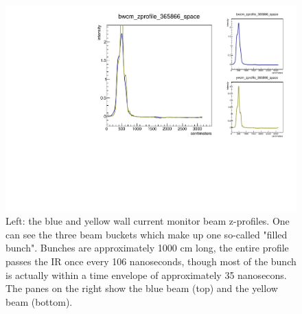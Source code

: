 \begin{figure}
\begin{center}
\includegraphics[width=\linewidth,height=\textheight,keepaspectratio]{../HourglassCorrection/figs/365866_wcm_zprofile}
\caption{ 
Left: the blue and yellow wall current monitor beam z-profiles. One can see the
three beam buckets which make up one so-called "filled bunch". Bunches are
approximately 1000 cm long, the entire profile passes the IR once every 106
nanoseconds, though most of the bunch is actually within a time envelope of
approximately 35 nanosecons. The panes on the right show the blue beam (top)
and the yellow beam (bottom).
}
\label{fig:365866_wcm_zprofile}
\end{center}
\end{figure}

